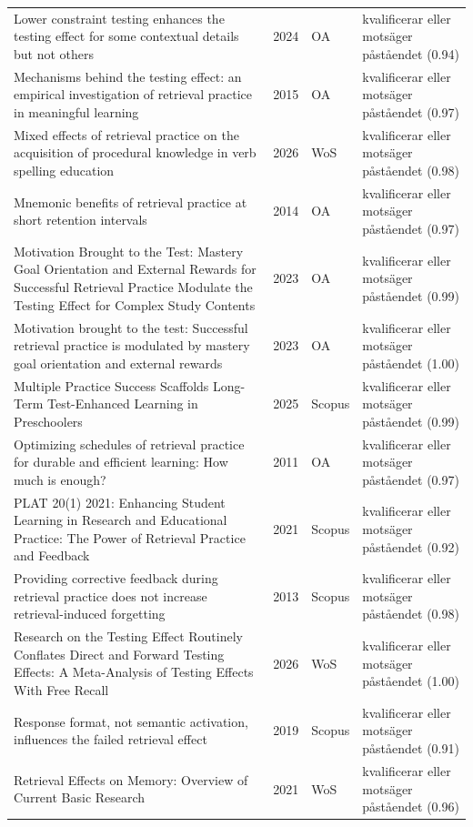 \begin{longtable}{@{}%
  >{\raggedright\arraybackslash}p{}c%
  >{\raggedright\arraybackslash}p{}%
  >{\raggedright\arraybackslash}p{}@{}}
Lower constraint testing enhances the testing effect for some contextual details but not others & 2024 & OA & kvalificerar eller motsäger påståendet (0.94) \\
Mechanisms behind the testing effect: an empirical investigation of retrieval practice in meaningful learning & 2015 & OA & kvalificerar eller motsäger påståendet (0.97) \\
Mixed effects of retrieval practice on the acquisition of procedural knowledge in verb spelling education & 2026 & WoS & kvalificerar eller motsäger påståendet (0.98) \\
Mnemonic benefits of retrieval practice at short retention intervals & 2014 & OA & kvalificerar eller motsäger påståendet (0.97) \\
Motivation Brought to the Test: Mastery Goal Orientation and External Rewards for Successful Retrieval Practice Modulate the Testing Effect for Complex Study Contents & 2023 & OA & kvalificerar eller motsäger påståendet (0.99) \\
Motivation brought to the test: Successful retrieval practice is modulated by mastery goal orientation and external rewards & 2023 & OA & kvalificerar eller motsäger påståendet (1.00) \\
Multiple Practice Success Scaffolds Long-Term Test-Enhanced Learning in Preschoolers & 2025 & Scopus & kvalificerar eller motsäger påståendet (0.99) \\
Optimizing schedules of retrieval practice for durable and efficient learning: How much is enough? & 2011 & OA & kvalificerar eller motsäger påståendet (0.97) \\
PLAT 20(1) 2021: Enhancing Student Learning in Research and Educational Practice: The Power of Retrieval Practice and Feedback & 2021 & Scopus & kvalificerar eller motsäger påståendet (0.92) \\
Providing corrective feedback during retrieval practice does not increase retrieval-induced forgetting & 2013 & Scopus & kvalificerar eller motsäger påståendet (0.98) \\
Research on \textquotedbl{}the Testing Effect\textquotedbl{} Routinely Conflates Direct and Forward Testing Effects: A Meta-Analysis of Testing Effects With Free Recall & 2026 & WoS & kvalificerar eller motsäger påståendet (1.00) \\
Response format, not semantic activation, influences the failed retrieval effect & 2019 & Scopus & kvalificerar eller motsäger påståendet (0.91) \\
Retrieval Effects on Memory: Overview of Current Basic Research & 2021 & WoS & kvalificerar eller motsäger påståendet (0.96) \\

\end{longtable}
